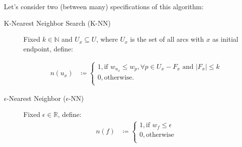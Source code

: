 \documentclass[12pt]{article}
\begin{document}
Let's consider two (between many)  specifications of this algorithm:

\begin{description}
	\item[K-Nearest Neighbor Search (K-NN)] Fixed $k \in \mathbb{N}$ and $U_x \subseteq U$, where $U_x$ is the set of all arcs with $x$ as initial endpoint, define:

	\begin{align*}
	n(u_x) &\coloneqq \begin{cases}
		1, \text{if }  w_{u_x} \le w_p, \forall p \in U_x - F_x \text{ and } |F_x| \le k \\
		0, \text{otherwise.} \\
		\end{cases}
	\end{align*}

	\item[$\epsilon$-Nearest Neighbor ($\epsilon$-NN)] Fixed $\epsilon \in\mathbb{R}$, define:
	\begin{align*}
		n(f) &\coloneqq \begin{cases}
			1, \text{if } w_f \le \epsilon \\
			0, \text{otherwise} \\
		\end{cases}
	\end{align*}
\end{description}
\end{document}
